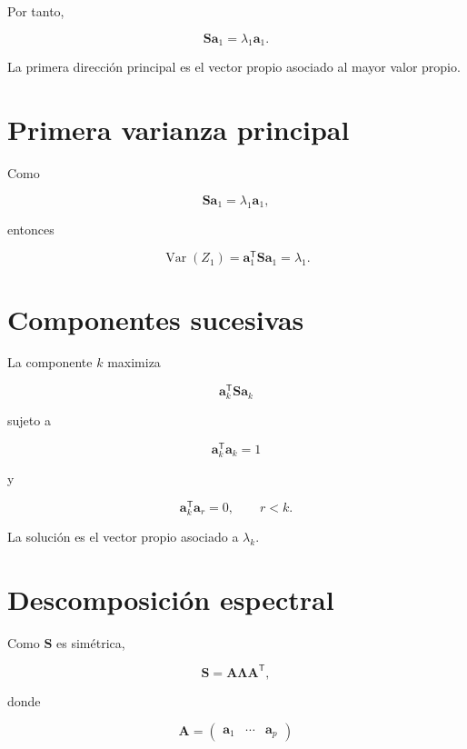 \documentclass[
  spanish,
  10.5pt,
  letterpaper,
  DIV=11,
  numbers=noendperiod,
  oneside,
  open=any]{scrreprt}
\theoremstyle{definition}
\theoremstyle{definition}
\theoremstyle{plain}
\theoremstyle{remark}
\begin{document}
Por tanto,

\[
\mathbf{S}\mathbf{a}_1
=
\lambda_1\mathbf{a}_1.
\]

La primera dirección principal es el vector propio asociado al mayor
valor propio.

\section*{Primera varianza principal}\label{primera-varianza-principal}


Como

\[
\mathbf{S}\mathbf{a}_1
=
\lambda_1\mathbf{a}_1,
\]

entonces

\[
\operatorname{Var}(Z_1)
=
\mathbf{a}_1^{\mathsf T}
\mathbf{S}
\mathbf{a}_1
=
\lambda_1.
\]

\section*{Componentes sucesivas}\label{componentes-sucesivas}


La componente \(k\) maximiza

\[
\mathbf{a}_k^{\mathsf T}
\mathbf{S}
\mathbf{a}_k
\]

sujeto a

\[
\mathbf{a}_k^{\mathsf T}\mathbf{a}_k=1
\]

y

\[
\mathbf{a}_k^{\mathsf T}\mathbf{a}_r=0,
\qquad r<k.
\]

La solución es el vector propio asociado a \(\lambda_k\).

\section*{Descomposición espectral}\label{descomposiciuxf3n-espectral-1}


Como \(\mathbf{S}\) es simétrica,

\[
\mathbf{S}
=
\mathbf{A}
\boldsymbol{\Lambda}
\mathbf{A}^{\mathsf T},
\]

donde

\[
\mathbf{A}
=
\begin{pmatrix}
\mathbf{a}_1 & \cdots & \mathbf{a}_p
\end{pmatrix}
\]
\end{document}
